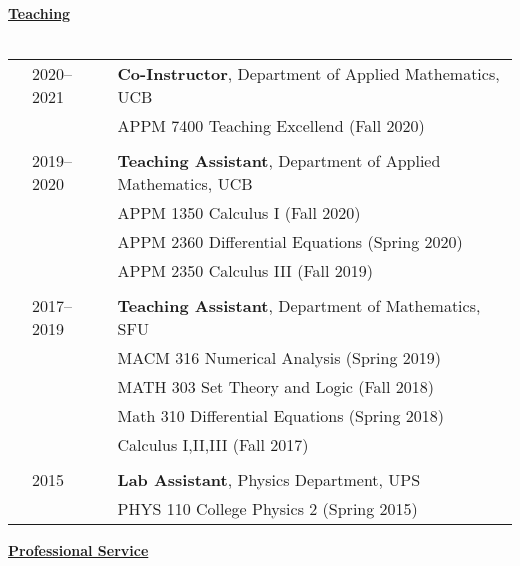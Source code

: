 \documentclass[letterpaper,11pt,oneside]{article}
\newcommand{\headr}[1]{\vspace{10pt}\uline{\Large{\textbf{#1}} \hfill } \\ \vspace{-10pt}\\}
\begin{document}
\headr{Teaching}

\begin{tabular}{@{} p{0.01cm} p{2cm} p{14cm}}
& 2020--2021 & \textbf{Co-Instructor}, Department of Applied Mathematics, UCB \\
&     & APPM 7400 Teaching Excellend (Fall 2020)\\
&&\\
& 2019-- 2020 & \textbf{Teaching Assistant}, Department of Applied Mathematics, UCB \\
&     & APPM 1350 Calculus I (Fall 2020)\\
&     & APPM 2360 Differential Equations (Spring 2020)\\
&     & APPM 2350 Calculus III (Fall 2019)\\
&&\\
& 2017--2019  & \textbf{Teaching Assistant}, Department of Mathematics, SFU  \\
&     & MACM 316 Numerical Analysis (Spring 2019) \\
&     & MATH 303 Set Theory and Logic (Fall 2018) \\ 
&     & Math 310 Differential Equations (Spring 2018) \\ 
&     & Calculus I,II,III (Fall 2017)\\
&&\\
& 2015  &\textbf{Lab Assistant}, Physics Department, UPS \\
&     & PHYS 110 College Physics 2 (Spring 2015) \\
\end{tabular}

\headr{Professional Service}
\end{document}
